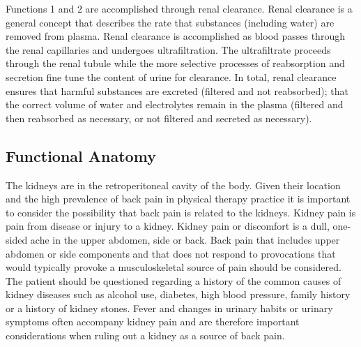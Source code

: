 Functions 1 and 2 are accomplished through renal clearance. Renal clearance is a general concept that describes the rate that substances (including water) are removed from plasma. Renal clearance is accomplished as blood passes through the renal capillaries and undergoes ultrafiltration. The ultrafiltrate proceeds through the renal tubule while the more selective processes of reabsorption and secretion fine tune the content of urine for clearance. In total, renal clearance ensures that harmful substances are excreted (filtered and not reabsorbed); that the correct volume of water and electrolytes remain in the plasma (filtered and then reabsorbed as necessary, or not filtered and secreted as necessary). 

\subsection{Functional Anatomy}

The kidneys are in the retroperitoneal cavity of the body.  Given their location and the high prevalence of back pain in physical therapy practice it is important to consider the possibility that back pain is related to the kidneys. Kidney pain is pain from disease or injury to a kidney. Kidney pain or discomfort is a dull, one-sided ache in the upper abdomen, side or back. Back pain that includes upper abdomen or side components and that does not respond to provocations that would typically provoke a musculoskeletal source of pain should be considered. The patient should be questioned regarding a history of the common causes of kidney diseases such as alcohol use, diabetes, high blood pressure, family history or a history of kidney stones. Fever and changes in urinary habits or urinary symptoms often accompany kidney pain and are therefore important considerations when ruling out a kidney as a source of back pain.

